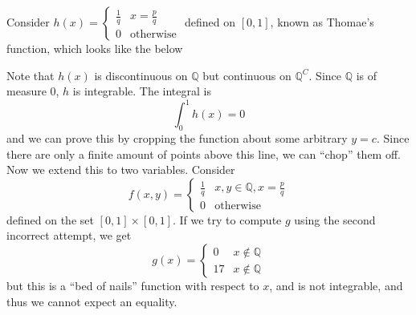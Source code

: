 \documentclass{article}
\begin{document}
Consider $h(x) = \begin{cases}
        \frac{1}{q} & x = \frac{p}{q}  \\
        0           & \text{otherwise}
    \end{cases}$ defined on $[0,1]$, known as Thomae's function, which looks like the below
\begin{center}
\end{center}
Note that $h(x)$ is discontinuous on $\mathbb{Q}$ but continuous on $\mathbb{Q}^C$. Since $\mathbb{Q}$ is of measure $0$, $h$ is integrable. The integral is
\begin{equation}
    \int_0^1 h(x) = 0
\end{equation}
and we can prove this by cropping the function about some arbitrary $y=c.$ Since there are only a finite amount of points above this line, we can ``chop'' them off. Now we extend this to two variables. Consider
\begin{equation}
    f(x,y) = \begin{cases}
        \frac{1}{q} & x,y\in \mathbb{Q}, x=\frac{p}{q} \\
        0           & \text{otherwise}
    \end{cases}
\end{equation}
defined on the set $[0,1]\times [0,1]$. If we try to compute $g$ using the second incorrect attempt, we get
\begin{equation}
    g(x) = \begin{cases}
        0  & x \notin \mathbb{Q} \\
        17 & x \notin \mathbb{Q}
    \end{cases}
\end{equation}
but this is a ``bed of nails'' function with respect to $x$, and is not integrable, and thus we cannot expect an equality.
\end{document}
